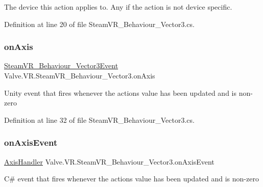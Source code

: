 The device this action applies to. Any if the action is not device specific. 



Definition at line 20 of file Steam\+V\+R\+\_\+\+Behaviour\+\_\+\+Vector3.\+cs.

\mbox{\label{class_valve_1_1_v_r_1_1_steam_v_r___behaviour___vector3_a463f57ec60c91ed45387c57adbd5abff}} 
\subsubsection{\texorpdfstring{onAxis}{onAxis}}
{\footnotesize\ttfamily \mbox{\hyperlink{class_valve_1_1_v_r_1_1_steam_v_r___behaviour___vector3_event}{Steam\+V\+R\+\_\+\+Behaviour\+\_\+\+Vector3\+Event}} Valve.\+V\+R.\+Steam\+V\+R\+\_\+\+Behaviour\+\_\+\+Vector3.\+on\+Axis}



Unity event that fires whenever the action\textquotesingle{}s value has been updated and is non-\/zero 



Definition at line 32 of file Steam\+V\+R\+\_\+\+Behaviour\+\_\+\+Vector3.\+cs.

\mbox{\label{class_valve_1_1_v_r_1_1_steam_v_r___behaviour___vector3_a71032989f53d8b8bcb8c496790c8c124}} 
\subsubsection{\texorpdfstring{onAxisEvent}{onAxisEvent}}
{\footnotesize\ttfamily \mbox{\hyperlink{class_valve_1_1_v_r_1_1_steam_v_r___behaviour___vector3_a6599185cabefcb861406669fdb78ce8a}{Axis\+Handler}} Valve.\+V\+R.\+Steam\+V\+R\+\_\+\+Behaviour\+\_\+\+Vector3.\+on\+Axis\+Event}



C\# event that fires whenever the action\textquotesingle{}s value has been updated and is non-\/zero 



